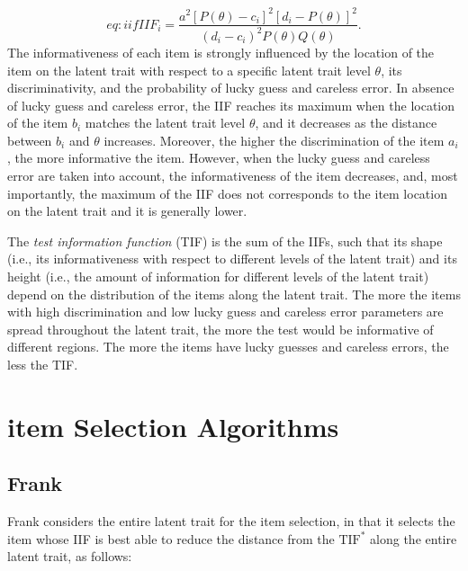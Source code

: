 \documentclass{svproc}
\begin{document}
\begin{equation}{eq:iif}
	IIF_i = \dfrac{a^2[P(\theta)-c_i]^2[d_i - P(\theta)]^2}{(d_i-c_i)^2 P(\theta)Q(\theta)}.
\end{equation}
The informativeness of each item is strongly influenced by the location of the item on the latent trait with respect to a specific latent trait level $\theta$, its discriminativity, and the probability of lucky guess and careless error. In absence of lucky guess and careless error, the IIF reaches its maximum when the location of the item $b_i$ matches the latent trait level $\theta$, and it decreases as the distance between $b_i$ and $\theta$ increases. Moreover, the higher the discrimination of the item $a_i$, the more informative the item. However, when the lucky guess and careless error are taken into account, the informativeness of the item decreases, and, most importantly, the maximum of the IIF does not corresponds to the item location on the latent trait and it is generally lower. 

The \emph{test information function} (TIF) is the sum of the IIFs, such that its shape (i.e., its informativeness with respect to different levels of the latent trait) and its height (i.e., the amount of information for different levels of the latent trait) depend on the distribution of the items along the latent trait. The more the items with high discrimination and low lucky guess and careless error parameters are spread throughout the latent trait, the more the test would be informative of different regions. The more the items have lucky guesses and careless errors, the less the TIF. 

\section{item Selection Algorithms}

\subsection{Frank}


Frank considers the entire latent trait for the item selection, in that it selects the item whose IIF is best able to reduce the distance from the $\text{TIF}^*$ along the entire latent trait, as follows:
\end{document}
